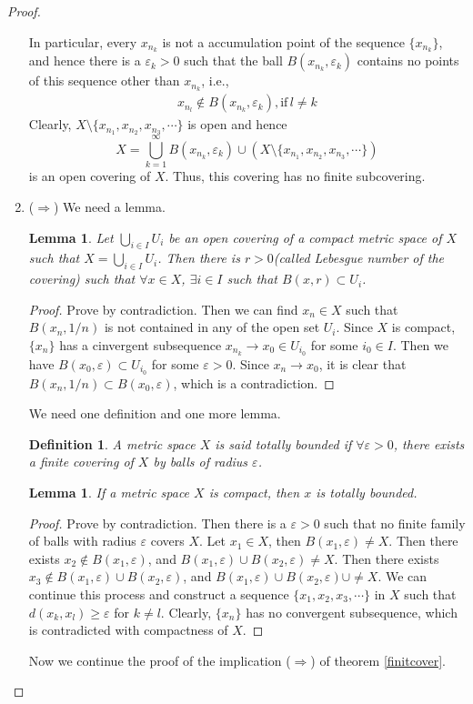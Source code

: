 \documentclass[12pt,leqno]{amsart}
\newtheorem{definition}{Definition}[section]
\newtheorem{lemma}[theorem]{Lemma}
\theoremstyle{definition}
\numberwithin{equation}{subsection}
\begin{document}
\begin{proof}
\begin{enumerate}
    In particular, every $x_{n_k}$ is not a accumulation point of the sequence $\{x_{n_k}\}$, and hence there is a $\varepsilon_k>0$ such that the ball $B(x_{n_k}, \varepsilon_k)$ contains no points of this sequence other than $x_{n_k}$, i.e., 
    \begin{align*}
        x_{n_l}\notin B(x_{n_k}, \varepsilon_k), \text{if}\,l\neq k
    \end{align*}
    Clearly, $X\setminus \{x_{n_1},x_{n_2},x_{n_3},\cdots\}$ is open and hence $$X = \bigcup^\infty_{k=1}B(x_{n_k},\varepsilon_k) \cup \left(X\setminus \{x_{n_1},x_{n_2},x_{n_3},\cdots\}\right)$$ 
    is an open covering of $X$. Thus, this covering has no finite subcovering.
    \item ($\Rightarrow$) We need a lemma.
    \begin{lemma}
    Let $\bigcup_{i\in I}U_i$ be an open covering of a compact metric space of $X$ such that $X = \bigcup_{i\in I}U_i$. Then there is $r>0$(called Lebesgue number of the covering) such that $\forall x\in X$, $\exists i\in I$ such that $B(x,r)\subset U_i$.
    \end{lemma}
    \begin{proof}
    Prove by contradiction. Then we can find $x_n\in X$ such that $B(x_n,1/n)$ is not contained in any of the open set $U_i$. Since $X$ is compact, $\{x_n\}$ has a cinvergent subsequence $x_{n_k}\to x_0\in U_{i_0}$ for some $i_0\in I$. Then we have $B(x_0, \varepsilon)\subset U_{i_0}$ for some $\varepsilon>0$. Since $x_n\to x_0$, it is clear that $B(x_n,1/n)\subset B(x_0, \varepsilon)$, which is a contradiction.
    \end{proof}
    We need one definition and one more lemma.
    \begin{definition}
    A metric space $X$ is said totally bounded if $\forall \varepsilon>0$, there exists a finite covering of $X$ by balls of radius $\varepsilon$.
    \end{definition}
    \begin{lemma}
    If a metric space $X$ is compact, then $x$ is totally bounded.
    \end{lemma}
    \begin{proof}Prove by contradiction. Then there is a $\varepsilon>0$ such that no finite family of balls with radius $\varepsilon$ covers $X$. Let $x_1\in X$, then $B(x_1,\varepsilon)\neq X$. Then there exists $x_2\notin B(x_1,\varepsilon)$, and $B(x_1,\varepsilon)\cup B(x_2,\varepsilon)\neq X$. Then there exists $x_3\notin B(x_1,\varepsilon)\cup B(x_2,\varepsilon)$, and $B(x_1,\varepsilon)\cup B(x_2,\varepsilon)\cup\neq X$. We can continue this process and construct a sequence $\{x_1,x_2,x_3,\cdots\}$ in $X$ such that $d(x_k,x_l)\geq \varepsilon$ for $k\neq l$. Clearly, $\{x_n\}$ has no convergent subsequence, which is contradicted with compactness of $X$.
    \end{proof}
    Now we continue the proof of the implication ($\Rightarrow$) of theorem \ref{finitcover}. 
    

\end{enumerate}
\end{proof}
\end{document}

